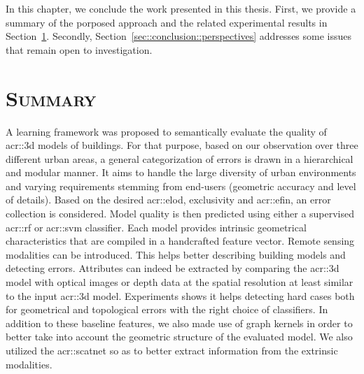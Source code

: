 \minitoc

\vfill

In this chapter, we conclude the work presented in this thesis.
First, we provide a summary of the porposed approach and the related experimental results in Section~\ref{sec::conclusion::summary}.
Secondly, Section~\ref{sec::conclusion::perspectives} addresses some issues that remain open to investigation.

\clearpage

\section{\textsc{Summary}}
    \label{sec::conclusion::summary}
    A learning framework was proposed to semantically evaluate the quality of \gls{acr::3d} models of buildings.
    For that purpose, based on our observation over three different urban areas, a general categorization of errors is drawn in a hierarchical and modular manner.
    It aims to handle the large diversity of urban environments and varying requirements stemming from end-users (geometric accuracy and level of details).
    Based on the desired \acrlong{acr::elod}, exclusivity and \acrlong{acr::efin}, an error collection is considered.
    Model quality is then predicted using either a supervised \acrlong{acr::rf} or \acrlong{acr::svm} classifier.
    Each model provides intrinsic geometrical characteristics that are compiled in a handcrafted feature vector.
    Remote sensing modalities can be introduced.
    This helps better describing building models and detecting errors.
    Attributes can indeed be extracted by comparing the \gls{acr::3d} model with optical images or depth data at the spatial resolution at least similar to the input \gls{acr::3d} model.
    Experiments shows it helps detecting hard cases both for geometrical and topological errors with the right choice of classifiers.
    In addition to these baseline features, we also made use of graph kernels in order to better take into account the geometric structure of the evaluated model.
    We also utilized the \acrlong{acr::scatnet} so as to better extract information from the extrinsic modalities.\\

